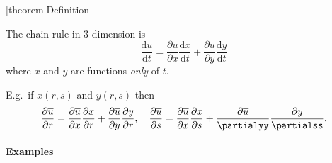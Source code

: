\documentclass[12pt]{report}
\theoremstyle{definition}
\begin{document}
[theorem]{Definition}
\begin{the chain rule}
    The chain rule in 3-dimension is\[
        \frac{\mathrm{d}u}{\mathrm{d}t} = \frac{\partial u}{\partial x} 
        \frac{\mathrm{d}x}{\mathrm{d}t} + \frac{\partial u}{\partial y} \frac{\mathrm{d}y}{\mathrm{d}t} 
    \]where $x$ and $y$ are functions \emph{only} of $t$.
\end{the chain rule}

E.g.\ if $x(r,s)$ and $y(r,s)$ then\[
    \frac{\partial \overline{u}}{\partial r} = \frac{\partial \overline{u}}{\partial x} 
    \frac{\partial x}{\partial r} + \frac{\partial \overline{u}}{\partial y} \frac{\partial y}{\partial r},\quad
    \frac{\partial \overline{u}}{\partial s} = \frac{\partial \overline{u}}{\partial x}
    \frac{\partial x}{\partial s} + \frac{\partial \overline{u}}{\partialyy} \frac{\partial y}{\partialss}.
\]

\paragraph{Examples}
\,
\end{document}
